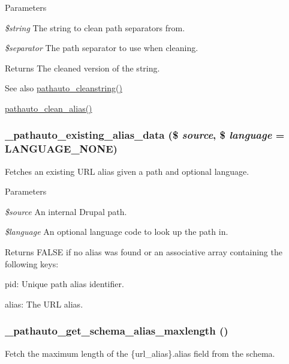 \begin{DoxyParams}{Parameters}
\item[{\em \$string}]The string to clean path separators from. \item[{\em \$separator}]The path separator to use when cleaning. \end{DoxyParams}
\begin{DoxyReturn}{Returns}
The cleaned version of the string.
\end{DoxyReturn}
\begin{DoxySeeAlso}{See also}
\hyperlink{pathauto_8inc_a0087774598dbc1a71658867d2275a3d1}{pathauto\_\-cleanstring()} 

\hyperlink{pathauto_8inc_a4a29b9c383bf47bb94f57e1602f847d9}{pathauto\_\-clean\_\-alias()} 
\end{DoxySeeAlso}
\hypertarget{pathauto_8inc_a4b36d2f45da703ece553f0d39f26d2b8}{
\subsubsection[{\_\-pathauto\_\-existing\_\-alias\_\-data}]{\setlength{\rightskip}{0pt plus 5cm}\_\-pathauto\_\-existing\_\-alias\_\-data (\$ {\em source}, \/  \$ {\em language} = {\ttfamily LANGUAGE\_\-NONE})}}
\label{pathauto_8inc_a4b36d2f45da703ece553f0d39f26d2b8}
Fetches an existing URL alias given a path and optional language.


\begin{DoxyParams}{Parameters}
\item[{\em \$source}]An internal Drupal path. \item[{\em \$language}]An optional language code to look up the path in. \end{DoxyParams}
\begin{DoxyReturn}{Returns}
FALSE if no alias was found or an associative array containing the following keys:
\begin{DoxyItemize}
\item pid: Unique path alias identifier.
\item alias: The URL alias. 
\end{DoxyItemize}
\end{DoxyReturn}
\hypertarget{pathauto_8inc_a9f709612633603049fcbd0c2f9b1ef09}{
\subsubsection[{\_\-pathauto\_\-get\_\-schema\_\-alias\_\-maxlength}]{\setlength{\rightskip}{0pt plus 5cm}\_\-pathauto\_\-get\_\-schema\_\-alias\_\-maxlength ()}}
\label{pathauto_8inc_a9f709612633603049fcbd0c2f9b1ef09}
Fetch the maximum length of the \{url\_\-alias\}.alias field from the schema.

